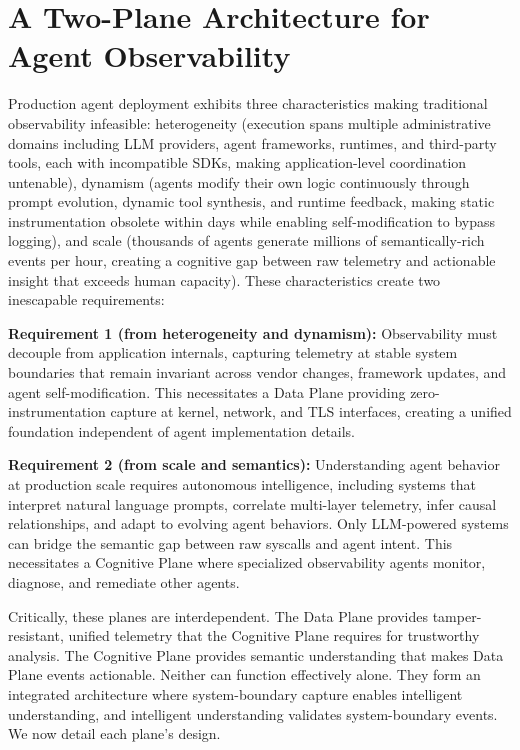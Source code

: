 \documentclass[sigplan,screen,9pt]{acmart}
\begin{document}
\section{A Two-Plane Architecture for Agent Observability}

Production agent deployment exhibits three characteristics making traditional observability infeasible: heterogeneity (execution spans multiple administrative domains including LLM providers, agent frameworks, runtimes, and third-party tools, each with incompatible SDKs, making application-level coordination untenable), dynamism (agents modify their own logic continuously through prompt evolution, dynamic tool synthesis, and runtime feedback, making static instrumentation obsolete within days while enabling self-modification to bypass logging), and scale (thousands of agents generate millions of semantically-rich events per hour, creating a cognitive gap between raw telemetry and actionable insight that exceeds human capacity). These characteristics create two inescapable requirements:

\textbf{Requirement 1 (from heterogeneity and dynamism):} Observability must decouple from application internals, capturing telemetry at stable system boundaries that remain invariant across vendor changes, framework updates, and agent self-modification. This necessitates a Data Plane providing zero-instrumentation capture at kernel, network, and TLS interfaces, creating a unified foundation independent of agent implementation details.

\textbf{Requirement 2 (from scale and semantics):} Understanding agent behavior at production scale requires autonomous intelligence, including systems that interpret natural language prompts, correlate multi-layer telemetry, infer causal relationships, and adapt to evolving agent behaviors. Only LLM-powered systems can bridge the semantic gap between raw syscalls and agent intent. This necessitates a Cognitive Plane where specialized observability agents monitor, diagnose, and remediate other agents.

Critically, these planes are interdependent. The Data Plane provides tamper-resistant, unified telemetry that the Cognitive Plane requires for trustworthy analysis. The Cognitive Plane provides semantic understanding that makes Data Plane events actionable. Neither can function effectively alone. They form an integrated architecture where system-boundary capture enables intelligent understanding, and intelligent understanding validates system-boundary events. We now detail each plane's design.
\end{document}
